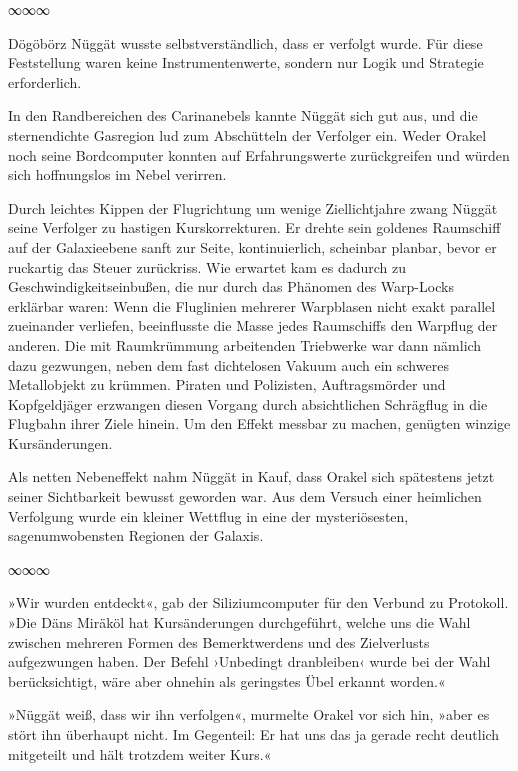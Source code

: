 \begin{center}
	∞∞∞
\end{center}

Dögöbörz Nüggät wusste selbstverständlich, dass er verfolgt wurde. Für diese Feststellung waren keine Instrumentenwerte, sondern nur Logik und Strategie erforderlich.

In den Randbereichen des Carinanebels kannte Nüggät sich gut aus, und die sternendichte Gasregion lud zum Abschütteln der Verfolger ein. Weder Orakel noch seine Bordcomputer konnten auf Erfahrungswerte zurückgreifen und würden sich hoffnungslos im Nebel verirren.

Durch leichtes Kippen der Flugrichtung um wenige Ziellichtjahre zwang Nüggät seine Verfolger zu hastigen Kurskorrekturen. Er drehte sein goldenes Raumschiff auf der Galaxieebene sanft zur Seite, kontinuierlich, scheinbar planbar, bevor er ruckartig das Steuer zurückriss. Wie erwartet kam es dadurch zu Geschwindigkeitseinbußen, die nur durch das Phänomen des Warp-Locks erklärbar waren: Wenn die Fluglinien mehrerer Warpblasen nicht exakt parallel zueinander verliefen, beeinflusste die Masse jedes Raumschiffs den Warpflug der anderen. Die mit Raumkrümmung arbeitenden Triebwerke war dann nämlich dazu gezwungen, neben dem fast dichtelosen Vakuum auch ein schweres Metallobjekt zu krümmen. Piraten und Polizisten, Auftragsmörder und Kopfgeldjäger erzwangen diesen Vorgang durch absichtlichen Schrägflug in die Flugbahn ihrer Ziele hinein.  Um den Effekt messbar zu machen, genügten winzige Kursänderungen.

Als netten Nebeneffekt nahm Nüggät in Kauf, dass Orakel sich spätestens jetzt seiner Sichtbarkeit bewusst geworden war. Aus dem Versuch einer heimlichen Verfolgung wurde ein kleiner Wettflug in eine der mysteriösesten, sagenumwobensten Regionen der Galaxis.

\begin{center}
	∞∞∞
\end{center}

»Wir wurden entdeckt«, gab der Siliziumcomputer für den Verbund zu Protokoll. »Die Däns Miräköl hat Kursänderungen durchgeführt, welche uns die Wahl zwischen mehreren Formen des Bemerktwerdens und des Zielverlusts aufgezwungen haben. Der Befehl ›Unbedingt dranbleiben‹ wurde bei der Wahl berücksichtigt, wäre aber ohnehin als geringstes Übel erkannt worden.«

»Nüggät weiß, dass wir ihn verfolgen«, murmelte Orakel vor sich hin, »aber es stört ihn überhaupt nicht. Im Gegenteil: Er hat uns das ja gerade recht deutlich mitgeteilt und hält trotzdem weiter Kurs.«

